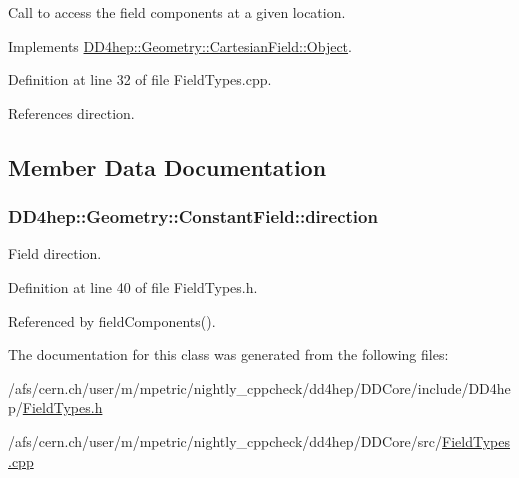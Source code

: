 Call to access the field components at a given location. 

Implements \hyperlink{class_d_d4hep_1_1_geometry_1_1_cartesian_field_1_1_object_ab3fa7f39545c8b0f769ee1ddfd03ed90}{DD4hep::Geometry::CartesianField::Object}.

Definition at line 32 of file FieldTypes.cpp.

References direction.

\subsection{Member Data Documentation}
\hypertarget{class_d_d4hep_1_1_geometry_1_1_constant_field_a986d167280511c4650ffa950188cdef7}{
\subsubsection[{direction}]{ {\bf DD4hep::Geometry::ConstantField::direction}}}
\label{class_d_d4hep_1_1_geometry_1_1_constant_field_a986d167280511c4650ffa950188cdef7}


Field direction. 

Definition at line 40 of file FieldTypes.h.

Referenced by fieldComponents().

The documentation for this class was generated from the following files:\begin{DoxyCompactItemize}
\item 
/afs/cern.ch/user/m/mpetric/nightly\_\-cppcheck/dd4hep/DDCore/include/DD4hep/\hyperlink{_field_types_8h}{FieldTypes.h}\item 
/afs/cern.ch/user/m/mpetric/nightly\_\-cppcheck/dd4hep/DDCore/src/\hyperlink{_field_types_8cpp}{FieldTypes.cpp}\end{DoxyCompactItemize}
